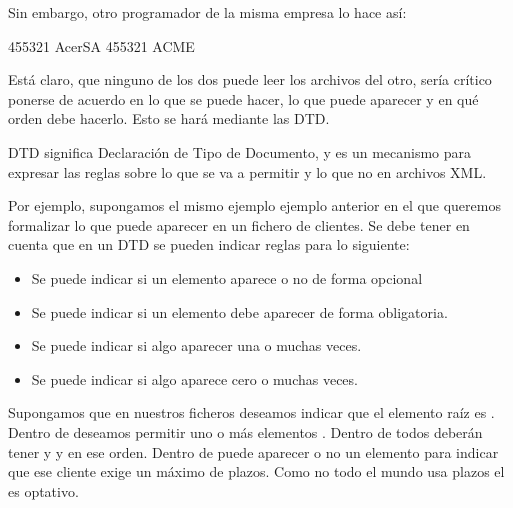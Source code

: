 \documentclass[letterpaper,10pt,spanish]{sphinxmanual}
\begin{document}
Sin embargo, otro programador de la misma empresa lo hace así:

\begin{sphinxVerbatim}[commandchars=\\\{\}]
                455321
                AcerSA
                455321
                ACME
\end{sphinxVerbatim}

Está claro, que ninguno de los dos puede leer los archivos del otro, sería crítico ponerse de acuerdo en lo que se puede hacer, lo que puede aparecer y en qué orden debe hacerlo. Esto se hará mediante las DTD.

DTD significa Declaración de Tipo de Documento, y es un mecanismo para expresar las reglas sobre lo que se va a permitir y lo que no en archivos XML.

Por ejemplo, supongamos el mismo ejemplo ejemplo anterior en el que queremos formalizar lo que puede aparecer en un fichero de clientes. Se debe tener en cuenta que en un DTD se pueden indicar reglas para lo siguiente:
\begin{itemize}
\item {} 
Se puede indicar si un elemento aparece o no de forma opcional

\item {} 
Se puede indicar si un elemento debe aparecer de forma obligatoria.

\item {} 
Se puede indicar si algo aparecer una o muchas veces.

\item {} 
Se puede indicar si algo aparece cero o muchas veces.

\end{itemize}

Supongamos que en nuestros ficheros deseamos indicar que el elemento raíz es . Dentro de  deseamos permitir uno o más elementos . Dentro de  todos deberán tener  y  y en ese orden. Dentro de  puede aparecer o no un elemento  para indicar que ese cliente exige un máximo de plazos. Como no todo el mundo usa plazos el  es optativo.
\end{document}
